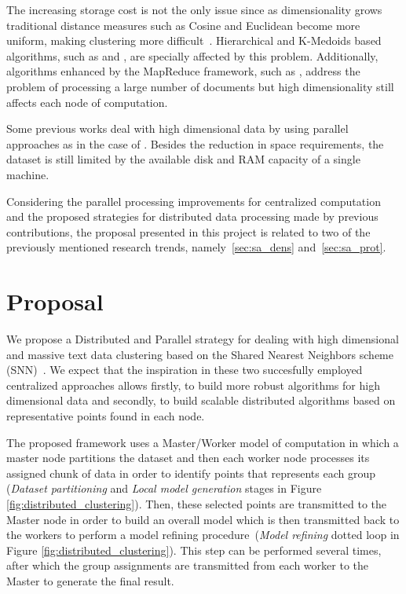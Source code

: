 \documentclass[10pt]{article}
\begin{document}
The increasing storage cost is not the only issue since as dimensionality grows traditional distance measures such as Cosine and Euclidean become more uniform, making clustering more difficult~\citep{ESK03}. Hierarchical and K-Medoids based algorithms, such as \citep{JK00} and \citep{JCHAC15}, are specially affected by this problem. Additionally, algorithms enhanced by the MapReduce framework, such as \citep{EIM11}, address the problem of processing a large number of documents but high dimensionality still affects each node of computation.

Some previous works deal with high dimensional data by using parallel approaches as in the case of \citep{DDGN15}. Besides the reduction in space requirements, the dataset is still limited by the available disk and RAM capacity of a single machine.

Considering the parallel processing improvements for centralized computation and the proposed strategies for distributed data processing made by previous contributions, the proposal presented in this project is related to two of the previously mentioned research trends, namely~\ref{sec:sa_dens} and~\ref{sec:sa_prot}.


\section{Proposal}
We propose a Distributed and Parallel strategy for dealing with high dimensional and massive text data clustering based on the Shared Nearest Neighbors scheme (SNN)~\citep{JP73}\citep{ESK03}. 
We expect that the inspiration in these two succesfully employed centralized approaches allows firstly, to build more robust algorithms for high dimensional data and secondly, to build scalable distributed algorithms based on representative points found in each node.

The proposed framework uses a Master/Worker model of computation in which a master node partitions the dataset and then each worker node processes its assigned chunk of data in order to identify points that represents each group (\textit{Dataset partitioning} and \textit{Local model generation} stages in Figure
\ref{fig:distributed_clustering}). Then, these selected points are transmitted to the Master node in order to build an overall model which is then transmitted back to the workers to perform a model refining procedure~(\textit{Model refining} dotted loop in Figure \ref{fig:distributed_clustering}). This step can be performed several times, after which the group assignments are transmitted from each worker to the Master to generate the final result.
\end{document}
